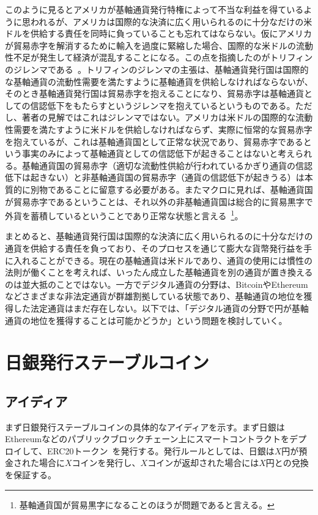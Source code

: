 \documentclass[dvipdfmx,a4paper]{jsarticle}
\begin{document}
このように見るとアメリカが基軸通貨発行特権によって不当な利益を得ているように思われるが、アメリカは国際的な決済に広く用いられるのに十分なだけの米ドルを供給する責任を同時に負っていることも忘れてはならない。仮にアメリカが貿易赤字を解消するために輸入を過度に緊縮した場合、国際的な米ドルの流動性不足が発生して経済が混乱することになる。この点を指摘したのがトリフィンのジレンマである~\cite{bordo2019triffin}。トリフィンのジレンマの主張は、基軸通貨発行国は国際的な基軸通貨の流動性需要を満たすように基軸通貨を供給しなければならないが、そのとき基軸通貨発行国は貿易赤字を抱えることになり、貿易赤字は基軸通貨としての信認低下をもたらすというジレンマを抱えているというものである。ただし、著者の見解ではこれはジレンマではない。アメリカは米ドルの国際的な流動性需要を満たすように米ドルを供給しなければならず、実際に恒常的な貿易赤字を抱えているが、これは基軸通貨国として正常な状況であり、貿易赤字であるという事実のみによって基軸通貨としての信認低下が起きることはないと考えられる。基軸通貨国の貿易赤字（適切な流動性供給が行われているかぎり通貨の信認低下は起きない）と非基軸通貨国の貿易赤字（通貨の信認低下が起きうる）は本質的に別物であることに留意する必要がある。またマクロに見れば、基軸通貨国が貿易赤字であるということは、それ以外の非基軸通貨国は総合的に貿易黒字で外貨を蓄積しているということであり正常な状態と言える~\footnote{基軸通貨国が貿易黒字になることのほうが問題であると言える。}。

まとめると、基軸通貨発行国は国際的な決済に広く用いられるのに十分なだけの通貨を供給する責任を負っており、そのプロセスを通じて膨大な貨幣発行益を手に入れることができる。現在の基軸通貨は米ドルであり、通貨の使用には慣性の法則が働くことを考えれば、いったん成立した基軸通貨を別の通貨が置き換えるのは並大抵のことではない。一方でデジタル通貨の分野は、BitcoinやEthereumなどさまざまな非法定通貨が群雄割拠している状態であり、基軸通貨の地位を獲得した法定通貨はまだ存在しない。以下では、「デジタル通貨の分野で円が基軸通貨の地位を獲得することは可能かどうか」という問題を検討していく。

\section{日銀発行ステーブルコイン}

\subsection{アイディア}

まず日銀発行ステーブルコインの具体的なアイディアを示す。まず日銀はEthereumなどのパブリックブロックチェーン上にスマートコントラクトをデプロイして、ERC20トークン~\cite{erc20token}を発行する。発行ルールとしては、日銀は$X$円が預金された場合に$X$コインを発行し、$X$コインが返却された場合には$X$円との兌換を保証する。
\end{document}
